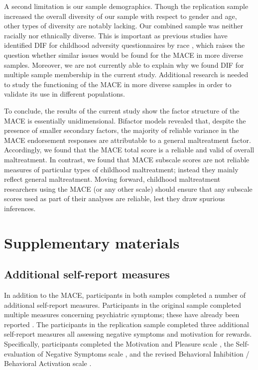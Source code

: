 \documentclass[letterpaper,man,natbib,floatsintext,longtable]{apa6}
\begin{document}
A second limitation is our sample demographics. Though the replication sample increased the overall diversity of our sample with respect to gender and age, other types of diversity are notably lacking. Our combined sample was neither racially nor ethnically diverse. This is important as previous studies have identified DIF for childhood adversity questionnaires by race \citep{rodriguez2019identification}, which raises the question whether similar issues would be found for the MACE in more diverse samples. Moreover, we are not currently able to explain why we found DIF for multiple  sample membership in the current study. Additional research is needed to study the functioning of the MACE in more diverse samples in order to validate its use in different populations. 

To conclude, the results of the current study show the factor structure of the MACE is essentially unidimensional. Bifactor models revealed that, despite the presence of smaller secondary factors, the majority of reliable variance in the MACE endorsement responses are attributable to a general maltreatment factor. Accordingly, we found that the MACE total score is a reliable and valid of overall maltreatment. In contrast, we found that MACE subscale scores are not reliable measures of particular types of childhood maltreatment; instead they mainly reflect general maltreatment. Moving forward, childhood maltreatment researchers using the MACE (or any other scale) should ensure that any subscale scores used as part of their analyses are reliable, lest they draw spurious inferences. 



\pagebreak
\section{Supplementary materials}

\setcounter{figure}{0}
\setcounter{table}{0}
\renewcommand{\thetable}{S\arabic{table}}
\renewcommand{\thefigure}{S\arabic{figure}}

\subsection*{Additional self-report measures}

In addition to the MACE, participants in both samples completed a number of additional self-report measures. Participants in the original sample completed multiple measures concerning psychiatric symptoms; these have already been reported . The participants in the replication sample completed three additional self-report measures all assessing negative symptoms and motivation for rewards. Specifically, participants completed the Motivation and Pleasure scale , the Self-evaluation of Negative Symptoms scale , and the revised Behavioral Inhibition / Behavioral Activation scale .
\end{document}
